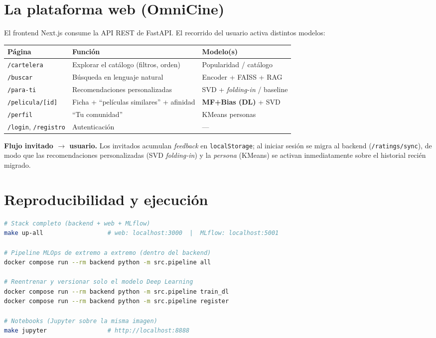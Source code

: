 \documentclass[11pt,a4paper]{article}
\newcommand{\code}[1]{\textcolor{omnidark}{\texttt{#1}}}
\begin{document}
\section{La plataforma web (OmniCine)}
\label{sec:webapp}
El frontend Next.js consume la API REST de FastAPI. El recorrido del usuario activa distintos modelos:

\begin{center}
\footnotesize
\begin{tabularx}{\textwidth}{@{}l X l@{}}
\toprule
\textbf{Página} & \textbf{Función} & \textbf{Modelo(s)} \\
\midrule
\code{/cartelera} & Explorar el catálogo (filtros, orden) & Popularidad / catálogo \\
\code{/buscar} & Búsqueda en lenguaje natural & Encoder + FAISS + RAG \\
\code{/para-ti} & Recomendaciones personalizadas & SVD + \textit{folding-in} / baseline \\
\code{/pelicula/[id]} & Ficha + ``películas similares'' + afinidad & \textbf{MF+Bias (DL)} + SVD \\
\code{/perfil} & ``Tu comunidad'' & KMeans personas \\
\code{/login}, \code{/registro} & Autenticación & --- \\
\bottomrule
\end{tabularx}
\end{center}

\textbf{Flujo invitado $\rightarrow$ usuario.} Los invitados acumulan \textit{feedback} en \code{localStorage}; al iniciar sesión se migra al backend (\code{/ratings/sync}), de modo que las recomendaciones personalizadas (SVD \textit{folding-in}) y la \textit{persona} (KMeans) se activan inmediatamente sobre el historial recién migrado.

\section{Reproducibilidad y ejecución}
\label{sec:repro}
\begin{lstlisting}[language=bash]
# Stack completo (backend + web + MLflow)
make up-all                  # web: localhost:3000  |  MLflow: localhost:5001

# Pipeline MLOps de extremo a extremo (dentro del backend)
docker compose run --rm backend python -m src.pipeline all

# Reentrenar y versionar solo el modelo Deep Learning
docker compose run --rm backend python -m src.pipeline train_dl
docker compose run --rm backend python -m src.pipeline register

# Notebooks (Jupyter sobre la misma imagen)
make jupyter                 # http://localhost:8888
\end{lstlisting}
\end{document}
